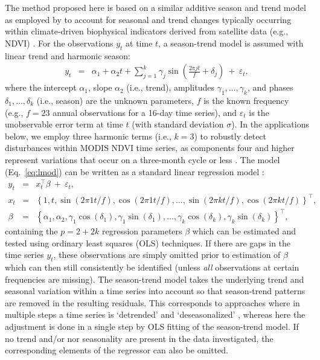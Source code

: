 \documentclass[authoryear,preprint,review,10pt]{elsarticle}
\begin{document}
The method proposed here is based on a similar additive season and trend model as employed by \citet{Verbesselt:2010wo} to account for seasonal and trend changes typically occurring within climate-driven biophysical indicators derived from satellite data (e.g., NDVI)  \citep{Beurs2005a}. For the observations $y_t$ at time $t$, a season-trend model is assumed with linear trend and harmonic season:
%
\begin{eqnarray} \label{eq:lmod}
  y_t & = & \alpha_1 + \alpha_2 t + \sum_{j = 1}^k \gamma_{j} \sin \left(\frac{2\pi j t}{f} + \delta_{j} \right) ~+~ \varepsilon_t,
\end{eqnarray}
%
where the intercept $\alpha_1$, slope $\alpha_2$ (i.e., trend), amplitudes $\gamma_1, \dots, \gamma_k$,
and phases $\delta_1, \dots, \delta_k$ (i.e., season) are the unknown parameters,
$f$ is the known frequency (e.g., $f = 23$ annual observations for a 16-day time series),
and $\varepsilon_t$ is the unobservable error term at time $t$ (with standard deviation $\sigma$). In the applications
below, we employ three harmonic terms (i.e., $k = 3$) to robustly detect disturbances within MODIS NDVI time series, as components four and higher represent variations
that occur on a three-month cycle or less \citep{Geerken2009,Julien2010}. The model (Eq.~\ref{eq:lmod}) can be written as a standard linear regression model \citep[see e.g.][Chapter~3.3]{Cryer2008}:
%
\begin{eqnarray*} \label{eq:OLSlmod}
  y_t   & = & x_t^\top \beta ~+~ \varepsilon_t, \\
  x_t   & = & \left\{1, t, \sin(2 \pi 1 t / f), \cos(2 \pi 1 t / f),
              \dots, \sin(2 \pi k t / f), \cos(2 \pi k t / f)\right\}^\top, \\
  \beta & = & \left\{\alpha_1, \alpha_2, \gamma_1 \cos(\delta_1), \gamma_1 \sin(\delta_1),
              \dots, \gamma_k \cos(\delta_k), \gamma_k \sin(\delta_k)\right\}^\top,
\end{eqnarray*}
%
containing the $p = 2 + 2 k$ regression parameters $\beta$ which can be estimated and tested using ordinary least squares (OLS) techniques.  If there are
gaps in the time series $y_t$, these observations are simply omitted prior to estimation of $\beta$ which can then still consistently  be identified (unless
\emph{all} observations at certain frequencies are missing). The season-trend model takes the underlying trend and seasonal variation within a time series
into account so that season-trend patterns are removed in the resulting residuals. This corresponds to approaches where in multiple steps a time series is
`detrended' and `deseasonalized' \citep[e.g.][]{Potter2003}, whereas here the adjustment is done in a single step by OLS fitting of the season-trend model.
If no trend and/or nor seasonality are present in the data investigated, the corresponding elements of the regressor can also be omitted.
\end{document}
